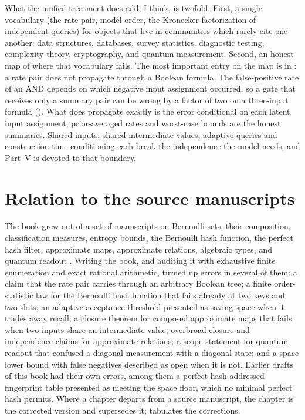 What the unified treatment does add, I think, is twofold. First, a single
vocabulary (the rate pair, model order, the Kronecker factorization of
independent queries) for objects that live in communities which rarely cite
one another: data structures, databases, survey statistics, diagnostic
testing, complexity theory, cryptography, and quantum measurement. Second, an
honest map of where that vocabulary fails. The most important entry on the map
is in : a rate pair does not propagate through a
Boolean formula. The false-positive rate of an AND depends on which negative
input assignment occurred, so a gate that receives only a summary pair can be
wrong by a factor of two on a three-input formula
(). What does propagate exactly is the error
conditional on each latent input assignment; prior-averaged rates and
worst-case bounds are the honest summaries. Shared inputs, shared intermediate
values, adaptive queries and construction-time conditioning each break the
independence the model needs, and Part~V is devoted to that boundary.

\section*{Relation to the source manuscripts}

The book grew out of a set of manuscripts on Bernoulli sets, their
composition, classification measures, entropy bounds, the Bernoulli hash
function, the perfect hash filter, approximate maps, approximate relations,
algebraic types, and quantum readout
\parencite{towell-bernoulli-sets,towell-bernoulli-composition,towell-bernoulli-classification-measures,towell-bernoulli-entropy,towell-bernoulli-hash-function,towell-bernoulli-phf,towell-bernoulli-maps,towell-bernoulli-relations,towell-bernoulli-data-type,towell-bernoulli-quantum-readout}.
Writing the book, and auditing it with exhaustive finite enumeration and exact
rational arithmetic, turned up errors in several of them: a claim that the rate
pair carries through an arbitrary Boolean tree; a finite order-statistic law
for the Bernoulli hash function that fails already at two keys and two slots;
an adaptive acceptance threshold presented as saving space when it trades away
recall; a closure theorem for composed approximate maps that fails when two
inputs share an intermediate value; overbroad closure and independence claims
for approximate relations; a scope statement for quantum readout that confused
a diagonal measurement with a diagonal state; and a space lower bound with
false negatives described as open when it is not. Earlier drafts of this book
had their own errors, among them a perfect-hash-addressed fingerprint table
presented as meeting the space floor, which no minimal perfect hash permits.
Where a chapter departs from a source manuscript, the chapter is the corrected
version and supersedes it;  tabulates the corrections.

